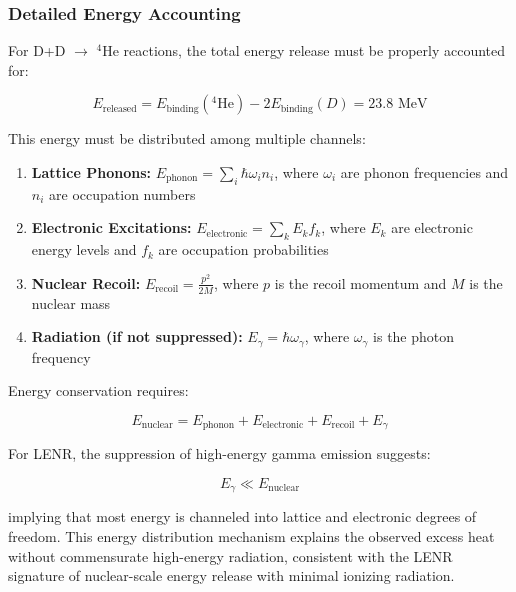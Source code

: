 \documentclass[11pt,a4paper]{article}
\begin{document}
\subsubsection{Detailed Energy Accounting}

For D+D $\rightarrow$ $^{4}$He reactions, the total energy release must be properly accounted for:

\begin{equation}
E_{\text{released}} = E_{\text{binding}}(^4\text{He}) - 2E_{\text{binding}}(D) = 23.8 \text{ MeV}
\end{equation}

This energy must be distributed among multiple channels:

\begin{enumerate}
\def\labelenumi{\arabic{enumi}.}
\item
  \textbf{Lattice Phonons:} $E_{\text{phonon}} = \sum_i \hbar \omega_i n_i$, where $\omega_i$ are phonon frequencies and $n_i$ are occupation numbers
\item
  \textbf{Electronic Excitations:} $E_{\text{electronic}} = \sum_k E_k f_k$, where $E_k$ are electronic energy levels and $f_k$ are occupation probabilities
\item
  \textbf{Nuclear Recoil:} $E_{\text{recoil}} = \frac{p^2}{2M}$, where $p$ is the recoil momentum and $M$ is the nuclear mass
\item
  \textbf{Radiation (if not suppressed):} $E_\gamma = \hbar \omega_\gamma$, where $\omega_\gamma$ is the photon frequency
\end{enumerate}

Energy conservation requires:

\begin{equation}
E_{\text{nuclear}} = E_{\text{phonon}} + E_{\text{electronic}} + E_{\text{recoil}} + E_\gamma
\end{equation}

For LENR, the suppression of high-energy gamma emission suggests:

\begin{equation}
E_\gamma \ll E_{\text{nuclear}}
\end{equation}

implying that most energy is channeled into lattice and electronic degrees of freedom. This energy distribution mechanism explains the observed excess heat without commensurate high-energy radiation, consistent with the LENR signature of nuclear-scale energy release with minimal ionizing radiation.
\end{document}
